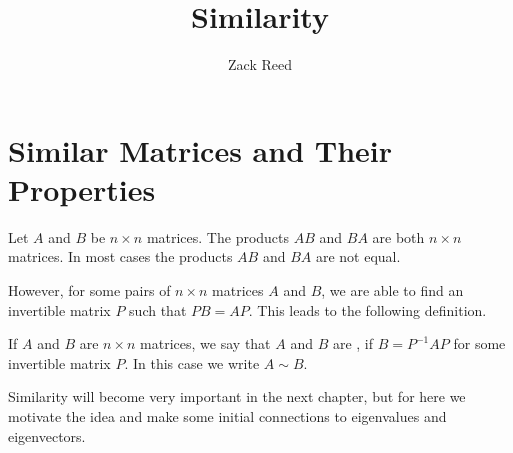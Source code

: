 \documentclass{ximera}
\author{Zack Reed}
\title{Similarity}
\begin{document}
\begin{abstract}

\end{abstract}
\maketitle

\section*{Similar Matrices and Their Properties}
 
Let $A$ and $B$ be $n \times n$ matrices. The products $AB$ and $BA$ are both $n \times n$ matrices.  In most cases the products $AB$ and $BA$ are not equal.
 
However, for some pairs of $n \times n$ matrices $A$ and $B$, we are able to find an invertible matrix $P$ such that $PB = AP$.  This leads to the following definition.
 
\begin{definition}\label{def:similar}
If $A$ and $B$ are $n \times n$ matrices, we say that $A$ and $B$ are , if $B = P^{-1}AP$ for some invertible matrix $P$.  In this case we write $A \sim B$.
\end{definition}

Similarity will become very important in the next chapter, but for here we motivate the idea and make some initial connections to eigenvalues and eigenvectors.

  
 
 
 
\end{document}

